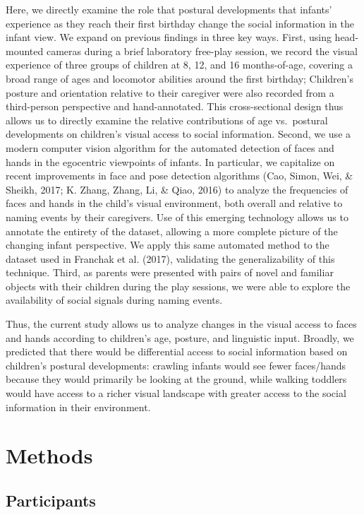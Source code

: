 \documentclass[english,man]{apa6}
\begin{document}
Here, we directly examine the role that postural developments that
infants' experience as they reach their first birthday change the social
information in the infant view. We expand on previous findings in three
key ways. First, using head-mounted cameras during a brief laboratory
free-play session, we record the visual experience of three groups of
children at 8, 12, and 16 months-of-age, covering a broad range of ages
and locomotor abilities around the first birthday; Children's posture
and orientation relative to their caregiver were also recorded from a
third-person perspective and hand-annotated. This cross-sectional design
thus allows us to directly examine the relative contributions of age
vs.~postural developments on children's visual access to social
information. Second, we use a modern computer vision algorithm for the
automated detection of faces and hands in the egocentric viewpoints of
infants. In particular, we capitalize on recent improvements in face and
pose detection algorithms (Cao, Simon, Wei, \& Sheikh, 2017; K. Zhang,
Zhang, Li, \& Qiao, 2016) to analyze the frequencies of faces and hands
in the child's visual environment, both overall and relative to naming
events by their caregivers. Use of this emerging technology allows us to
annotate the entirety of the dataset, allowing a more complete picture
of the changing infant perspective. We apply this same automated method
to the dataset used in Franchak et al. (2017), validating the
generalizability of this technique. Third, as parents were presented
with pairs of novel and familiar objects with their children during the
play sessions, we were able to explore the availability of social
signals during naming events.

Thus, the current study allows us to analyze changes in the visual
access to faces and hands according to children's age, posture, and
linguistic input. Broadly, we predicted that there would be differential
access to social information based on children's postural developments:
crawling infants would see fewer faces/hands because they would
primarily be looking at the ground, while walking toddlers would have
access to a richer visual landscape with greater access to the social
information in their environment.

\section{Methods}\label{methods}

\subsection{Participants}\label{participants}
\end{document}
